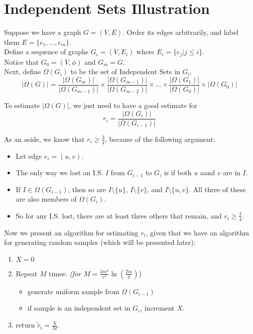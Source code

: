 
\section{Independent Sets Illustration}

Suppose we have a graph $G = (V,E)$. Order its edges arbitrarily, and label them $E = \{e_1, \ldots, e_m\}$. \\
Define a sequence of graphs $G_i = (V, E_i)$ where $E_i = \{ e_j | j \leq i \}$. \\
Notice that $G_0 = (V, \phi)$ and $G_m = G$. \\
Next, define $\Omega(G_i)$ to be the set of Independent Sets in $G_i$.
\[ |\Omega(G)| = \frac{|\Omega(G_m)|}{|\Omega(G_{m-1})|} \times \frac{|\Omega(G_{m-1})|}{|\Omega(G_{m-2})|} \times \ldots \times \frac{|\Omega(G_1)|}{|\Omega(G_{0})|} \times |\Omega(G_0)| \]

To estimate $|\Omega(G)|$, we just need to have a good estimate for
\[ r_i = \frac{|\Omega(G_i)|}{|\Omega(G_{i-1})|} \]

As an aside, we know that $r_i \geq \frac{3}{4}$, because of the following argument:
\begin{itemize}
\item Let edge $e_i = (u,v)$.
\item The only way we lost an I.S. $I$ from $G_{i-1}$ to $G_i$ is if both $u$ aand $v$ are in $I$.
\item If $I \in \Omega(G_{i-1})$, then so are $I \setminus \{u\}$, $I \setminus \{v\}$, and $I \setminus \{u, v\}$. All three of these are also members of $\Omega(G_i)$.
\item So for any I.S. lost, there are at least three others that remain, and $r_i \geq \frac{3}{4}$.
\end{itemize}

Now we present an algorithm for estimating $r_i$, given that we have an algorithm for generating random samples (which will be presented later):

\begin{enumerate}
\item $X = 0$
\item Repeat $M$ times: \emph{(for $M = \frac{3m^2}{\epsilon^2} \ln(\frac{2m}{\delta})$})
\begin{itemize}
\item generate uniform sample from $\Omega(G_{i-1})$
\item if sample is an independent set in $G_i$, increment $X$.
\end{itemize}
\item return $\tilde r_i = \frac{X}{M}$.
\end{enumerate}

